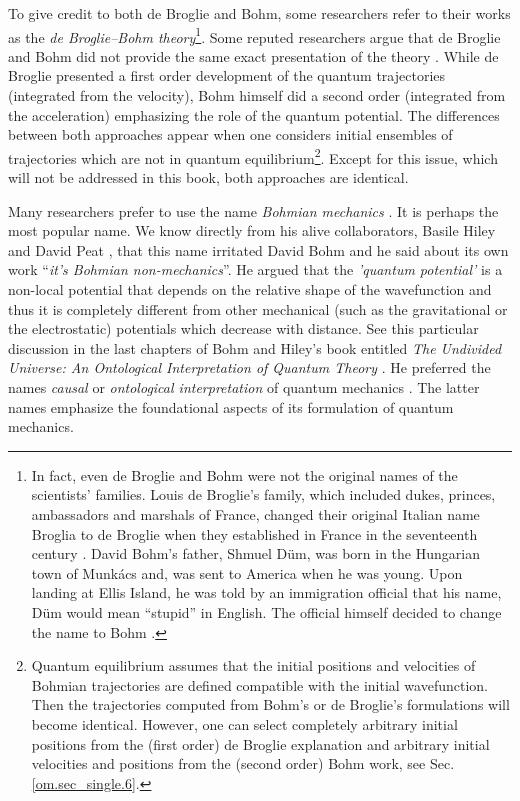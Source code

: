 \documentclass[nofootinbib, secnumarabic, amsmath, nobibnotes,11pt,aps,pra, floatfix]{revtex4-1}
\newcommand{\sref}[1]{Sec. \ref{#1}}
\begin{document}
To give credit to both de Broglie and Bohm, some researchers refer to their works as the \emph{de Broglie--Bohm theory}\footnote{In fact, even de Broglie and Bohm were not the original names of the scientists' families.  Louis de Broglie's family, which included dukes, princes, ambassadors and marshals of France, changed their original Italian name Broglia to de Broglie when they established in France in the seventeenth century \cite{om.valentini2009Solvay}. David Bohm's father,  Shmuel D\"um,  was born in the Hungarian town of Munk\'acs and, was sent to America when he was young. Upon landing at Ellis Island, he was told by an immigration official that his name, D\"um would mean ``stupid'' in English. The official himself decided to change the name to Bohm \cite{om.infinite_potential}.}\cite{om.Holand1993}.
Some reputed researchers argue that de Broglie and Bohm did not provide the same exact presentation of the theory \cite{om.Valentini2006,om.valentini2008}. While de Broglie presented a first order development of the quantum trajectories (integrated from the velocity), Bohm himself did a second order (integrated from the acceleration) emphasizing the role of the quantum potential. The differences between both approaches appear when one considers initial ensembles of trajectories which are not in quantum equilibrium\footnote{Quantum equilibrium assumes that the initial positions and velocities of Bohmian trajectories are defined compatible with the initial wavefunction. Then the trajectories computed from Bohm's or de Broglie's formulations will become identical. However, one can select completely arbitrary initial positions from the (first order) de Broglie explanation and arbitrary initial velocities and positions from the (second order) Bohm work, see \sref{om.sec_single.6}.}. Except for this issue, which will not be addressed in this book, both approaches are identical.



Many researchers prefer to use the name \emph{Bohmian mechanics} \cite{om.Bohmian1996}. It is perhaps the most popular name. We know directly from his alive collaborators, Basile Hiley and David Peat \cite{om.davidpeat}, that this name irritated David Bohm and he said about its own work ``\textit{it's Bohmian non-mechanics}''. He argued that the {\emph{'quantum potential'}} is a non-local potential that depends on the relative shape of the wavefunction and thus it is completely different from other mechanical (such as the gravitational or the electrostatic) potentials which decrease with distance. See this particular discussion in the last chapters of Bohm and Hiley's book entitled \emph{The Undivided Universe: An Ontological Interpretation of Quantum Theory} \cite{om.Bohm1993}. He preferred the names \emph{causal} or \emph{ontological interpretation} of quantum mechanics \cite{om.Holand1993,om.Bohm1993}. The latter names emphasize the foundational aspects of its formulation of quantum mechanics.
\end{document}
